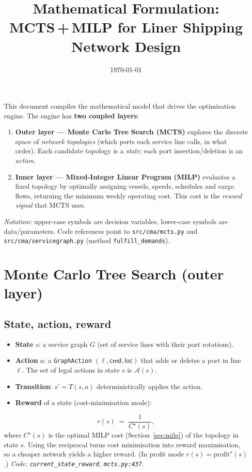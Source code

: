 \documentclass[11pt]{article}
\title{\textbf{Mathematical Formulation:\\ MCTS\,+\,MILP for Liner Shipping Network Design}}
\author{}
\date{\today}
\begin{document}
\maketitle

\noindent
This document compiles the mathematical model that drives the optimisation engine.
The engine has \textbf{two coupled layers}:
\begin{enumerate}[leftmargin=*]
  \item \textbf{Outer layer --- Monte Carlo Tree Search (MCTS)} explores the discrete
  space of \emph{network topologies} (which ports each service line calls, in what
  order). Each candidate topology is a \emph{state}; each port insertion/deletion is
  an \emph{action}.
  \item \textbf{Inner layer --- Mixed-Integer Linear Program (MILP)} evaluates a fixed
  topology by optimally assigning vessels, speeds, schedules and cargo flows,
  returning the minimum weekly operating cost. This cost is the \emph{reward signal}
  that MCTS uses.
\end{enumerate}

\noindent
\textit{Notation:} upper-case symbols are decision variables, lower-case symbols are
data/parameters. Code references point to \texttt{src/cma/mcts.py} and
\texttt{src/cma/servicegraph.py} (method \texttt{fulfill\_demands}).

\tableofcontents
\bigskip

\section{Monte Carlo Tree Search (outer layer)}

\subsection{State, action, reward}
\begin{itemize}[leftmargin=*]
  \item \textbf{State} $s$: a service graph $G$ (set of service lines with their port
  rotations).
  \item \textbf{Action} $a$: a \texttt{GraphAction} $(\ell,\textsf{cmd},\textsf{loc})$
  that adds or deletes a port in line $\ell$. The set of legal actions in state $s$ is
  $\mathcal{A}(s)$.
  \item \textbf{Transition}: $s' = T(s,a)$ deterministically applies the action.
  \item \textbf{Reward} of a state (cost-minimisation mode):
\end{itemize}
\begin{equation}
  r(s) \;=\; \frac{1}{C^\star(s)},
\end{equation}
where $C^\star(s)$ is the optimal MILP cost (Section~\ref{sec:milp}) of the topology in
state $s$. Using the reciprocal turns cost minimisation into reward maximisation, so a
cheaper network yields a higher reward. (In profit mode $r(s)=\text{profit}^\star(s)$.)
\textit{Code: \texttt{current\_state\_reward}, \texttt{mcts.py:437}.}
\end{document}
